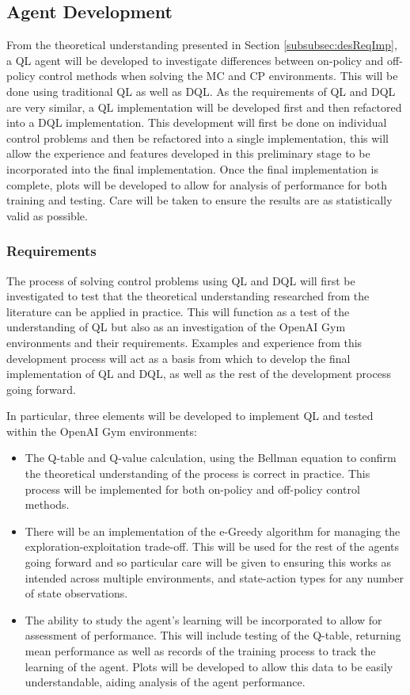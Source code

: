 \documentclass[hidelinks,journal]{IEEEtran}
\begin{document}
\subsection{Agent Development}
\label{subsec:desArteDev}
From the theoretical understanding presented in Section \ref{subsubsec:desReqImp}, a QL agent will be developed to investigate differences between on-policy and off-policy control methods when solving the MC and CP environments. This will be done using traditional QL as well as DQL. As the requirements of QL and DQL are very similar, a QL implementation will be developed first and then refactored into a DQL implementation. This development will first be done on individual control problems and then be refactored into a single implementation, this will allow the experience and features developed in this preliminary stage to be incorporated into the final implementation. Once the final implementation is complete, plots will be developed to allow for analysis of performance for both training and testing. Care will be taken to ensure the results are as statistically valid as possible.
\subsubsection{Requirements}
\label{subsubsec:desArteDevReq}
The process of solving control problems using QL and DQL will first be investigated to test that the theoretical understanding researched from the literature can be applied in practice. This will function as a test of the understanding of QL but also as an investigation of the OpenAI Gym environments and their requirements. Examples and experience from this development process will act as a basis from which to develop the final implementation of QL and DQL, as well as the rest of the development process going forward.

In particular, three elements will be developed to implement QL and tested within the OpenAI Gym environments:
\begin{itemize}
  \item{The Q-table and Q-value calculation, using the Bellman equation to confirm the theoretical understanding of the process is correct in practice. This process will be implemented for both on-policy and off-policy control methods.}
  \item{There will be an implementation of the e-Greedy algorithm for managing the exploration-exploitation trade-off. This will be used for the rest of the agents going forward and so particular care will be given to ensuring this works as intended across multiple environments, and state-action types for any number of state observations.}
  \item{The ability to study the agent’s learning will be incorporated to allow for assessment of performance. This will include testing of the Q-table, returning mean performance as well as records of the training process to track the learning of the agent. Plots will be developed to allow this data to be easily understandable, aiding analysis of the agent performance.}
\end{itemize}
\end{document}
